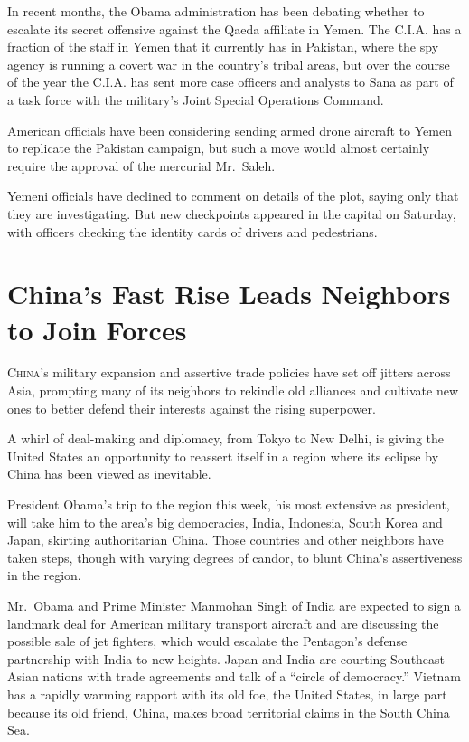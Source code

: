 ﻿\documentclass[12pt]{article}
\begin{document}
In recent months, the Obama administration has been debating whether to escalate its secret
offensive against the Qaeda affiliate in Yemen. The C.I.A. has a fraction of the staff in Yemen that
it currently has in Pakistan, where the spy agency is running a covert war in the country's tribal
areas, but over the course of the year the C.I.A. has sent more case officers and analysts to Sana
as part of a task force with the military's Joint Special Operations Command.

American officials have been considering sending armed drone aircraft to Yemen to replicate the
Pakistan campaign, but such a move would almost certainly require the approval of the mercurial
Mr.~Saleh.

Yemeni officials have declined to comment on details of the plot, saying only that they are
investigating. But new checkpoints appeared in the capital on Saturday, with officers checking the
identity cards of drivers and pedestrians.

\section{China's Fast Rise Leads Neighbors to Join Forces}

\lettrine{C}{hina}'s military expansion and assertive trade policies have
set off jitters across Asia, prompting many of its neighbors to rekindle old alliances and cultivate
new ones to better defend their interests against the rising superpower.

A whirl of deal-making and diplomacy, from Tokyo to New Delhi, is giving the United States an
opportunity to reassert itself in a region where its eclipse by China has been viewed as inevitable.

President Obama's trip to the region this week, his most extensive as president, will take him to
the area's big democracies, India, Indonesia, South Korea and Japan, skirting authoritarian China.
Those countries and other neighbors have taken steps, though with varying degrees of candor, to
blunt China's assertiveness in the region.

Mr.~Obama and Prime Minister Manmohan Singh of India are expected to sign a landmark deal for
American military transport aircraft and are discussing the possible sale of jet fighters, which
would escalate the Pentagon's defense partnership with India to new heights. Japan and India are
courting Southeast Asian nations with trade agreements and talk of a ``circle of democracy.''
Vietnam has a rapidly warming rapport with its old foe, the United States, in large part because its
old friend, China, makes broad territorial claims in the South China Sea.
\end{document}
